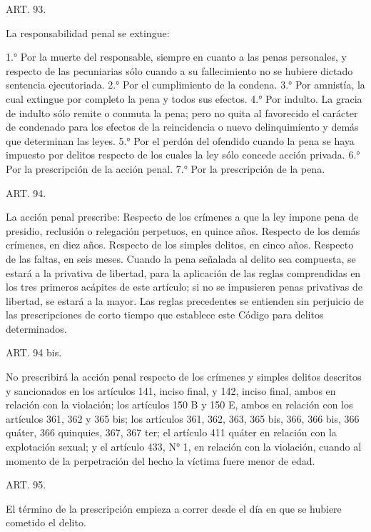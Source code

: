     ART. 93.

    La responsabilidad penal se extingue:

    1.° Por la muerte del responsable, siempre en cuanto a las penas personales, y respecto de las pecuniarias sólo cuando a su fallecimiento no se hubiere dictado sentencia ejecutoriada.
    2.° Por el cumplimiento de la condena.
    3.° Por amnistía, la cual extingue por completo la pena y todos sus efectos.
    4.° Por indulto.
    La gracia de indulto sólo remite o conmuta la pena; pero no quita al favorecido el carácter de condenado para los efectos de la reincidencia o nuevo delinquimiento y demás que determinan las leyes.
    5.° Por el perdón del ofendido cuando la pena se haya impuesto por delitos respecto de los cuales la ley sólo concede acción privada.
    6.° Por la prescripción de la acción penal.
    7.° Por la prescripción de la pena.


    ART. 94.

    La acción penal prescribe:
    Respecto de los crímenes a que la ley impone pena de presidio, reclusión o relegación perpetuos, en quince años.
    Respecto de los demás crímenes, en diez años.
    Respecto de los simples delitos, en cinco años.
    Respecto de las faltas, en seis meses.
    Cuando la pena señalada al delito sea compuesta, se estará a la privativa de libertad, para la aplicación de las reglas comprendidas en los tres primeros acápites de este artículo; si no se impusieren penas privativas de libertad, se estará a la mayor.
    Las reglas precedentes se entienden sin perjuicio de las prescripciones de corto tiempo que establece este Código para delitos determinados.





    ART. 94 bis.

    No prescribirá la acción penal respecto de los crímenes y simples delitos descritos y sancionados en los artículos 141, inciso final, y 142, inciso final, ambos en relación con la violación; los artículos 150 B y 150 E, ambos en relación con los artículos 361, 362 y 365 bis; los artículos 361, 362, 363, 365 bis, 366, 366 bis, 366 quáter, 366 quinquies, 367, 367 ter; el artículo 411 quáter en relación con la explotación sexual; y el artículo 433, N° 1, en relación con la violación, cuando al momento de la perpetración del hecho la víctima fuere menor de edad.

    ART. 95.

    El término de la prescripción empieza a correr desde el día en que se hubiere cometido el delito.



